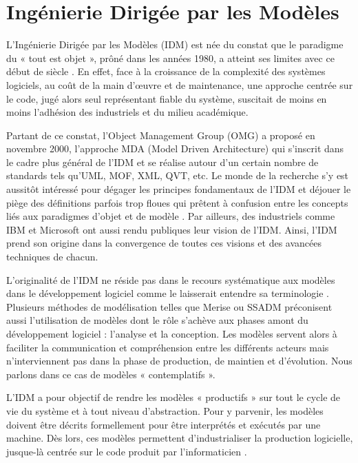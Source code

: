 \section{Ingénierie Dirigée par les Modèles}

L'Ingénierie Dirigée par les Modèles (IDM) est née du constat que le paradigme du « tout est objet », prôné dans les années 1980, a atteint ses limites avec ce début de siècle \cite{greenfield2004software}. En effet, face à la croissance de la complexité des systèmes logiciels, au coût de la main d'œuvre et de maintenance, une approche centrée sur le code, jugé alors seul représentant fiable du système, suscitait de moins en moins l'adhésion des industriels et du milieu académique. 

Partant de ce constat, l'Object Management Group (OMG) a proposé en novembre 2000, l'approche MDA (Model Driven Architecture) qui s'inscrit dans le cadre plus général de l'IDM et se réalise autour d'un certain nombre de standards tels qu'UML, MOF, XML, QVT, etc. Le monde de la recherche s'y est aussitôt intéressé pour dégager les principes fondamentaux de l'IDM \cite{bezivin2001towards}\cite{kent2002model} \cite{de2002using} et déjouer le piège des définitions parfois trop floues qui prêtent à confusion entre les concepts liés aux paradigmes d'objet et de modèle \cite{bezivin2004search}. Par ailleurs, des industriels comme IBM \cite{booch2004mda} et Microsoft \cite{greenfield2004software} ont aussi rendu publiques leur vision de l'IDM. Ainsi, l'IDM prend son origine dans la convergence de toutes ces visions et des avancées techniques de chacun.

L'originalité de l'IDM ne réside pas dans le recours systématique aux modèles dans le développement logiciel comme le laisserait entendre sa terminologie  \cite{bezivin2004rapport}. Plusieurs méthodes de modélisation telles que Merise ou SSADM préconisent aussi l'utilisation de modèles dont le rôle s'achève aux phases amont du développement logiciel : l'analyse et la conception. Les modèles servent alors à faciliter la communication et compréhension entre les différents acteurs mais n'interviennent pas dans la phase de production, de maintien et d'évolution. Nous parlons dans ce cas de modèles « contemplatifs ». 

L'IDM a pour objectif de rendre les modèles « productifs » sur tout le cycle de vie du système et à tout niveau d'abstraction. Pour y parvenir, les modèles doivent être décrits formellement pour être interprétés et exécutés par une machine. Dès lors, ces modèles permettent d'industrialiser la production logicielle, jusque-là centrée sur le code produit par l'informaticien \cite{bezivin2005unification}.

